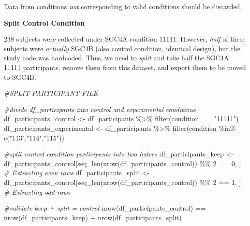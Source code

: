\documentclass[
]{article}
\newenvironment{Shaded}{\begin{snugshade}}{\end{snugshade}}
\newcommand{\CommentTok}[1]{\textcolor[rgb]{0.56,0.35,0.01}{\textit{#1}}}
\newcommand{\DecValTok}[1]{\textcolor[rgb]{0.00,0.00,0.81}{#1}}
\newcommand{\FunctionTok}[1]{\textcolor[rgb]{0.00,0.00,0.00}{#1}}
\newcommand{\NormalTok}[1]{#1}
\newcommand{\OtherTok}[1]{\textcolor[rgb]{0.56,0.35,0.01}{#1}}
\newcommand{\SpecialCharTok}[1]{\textcolor[rgb]{0.00,0.00,0.00}{#1}}
\newcommand{\StringTok}[1]{\textcolor[rgb]{0.31,0.60,0.02}{#1}}
\begin{document}
Data from conditions \emph{not} corresponding to valid conditions should
be discarded.

\textbf{Split Control Condition}

238 subjects were collected under SGC4A condition 11111. However,
\emph{half} of these subjects were \emph{actually} SGC4B (also control
condition, identical design), but the study code was hardcoded. Thus, we
need to \emph{split} and take half the SGC4A 11111 participants, remove
them from this dataset, and export them to be moved to SGC4B.

\begin{Shaded}
\begin{Highlighting}[]
\CommentTok{\#SPLIT PARTICIPANT FILE}

\CommentTok{\#divide df\_participants into control and experimental conditions}
\NormalTok{df\_participants\_control }\OtherTok{\textless{}{-}}\NormalTok{ df\_participants }\SpecialCharTok{\%\textgreater{}\%} \FunctionTok{filter}\NormalTok{(condition }\SpecialCharTok{==} \StringTok{"11111"}\NormalTok{)}
\NormalTok{df\_participants\_experimental }\OtherTok{\textless{}{-}}\NormalTok{ df\_participants }\SpecialCharTok{\%\textgreater{}\%} \FunctionTok{filter}\NormalTok{(condition }\SpecialCharTok{\%in\%}  \FunctionTok{c}\NormalTok{(}\StringTok{"113"}\NormalTok{,}\StringTok{"114"}\NormalTok{,}\StringTok{"115"}\NormalTok{))}

\CommentTok{\#split control condition participants into two halves}
\NormalTok{df\_participants\_keep }\OtherTok{\textless{}{-}}\NormalTok{ df\_participants\_control[}\FunctionTok{seq\_len}\NormalTok{(}\FunctionTok{nrow}\NormalTok{(df\_participants\_control)) }\SpecialCharTok{\%\%} \DecValTok{2} \SpecialCharTok{==} \DecValTok{0}\NormalTok{, ]   }\CommentTok{\# Extracting even rows}
\NormalTok{df\_participants\_split }\OtherTok{\textless{}{-}}\NormalTok{ df\_participants\_control[}\FunctionTok{seq\_len}\NormalTok{(}\FunctionTok{nrow}\NormalTok{(df\_participants\_control)) }\SpecialCharTok{\%\%} \DecValTok{2} \SpecialCharTok{==} \DecValTok{1}\NormalTok{, ]   }\CommentTok{\# Extracting odd rows}

\CommentTok{\#validate keep + split = control }
\FunctionTok{nrow}\NormalTok{(df\_participants\_control) }\SpecialCharTok{==} \FunctionTok{nrow}\NormalTok{(df\_participants\_keep) }\SpecialCharTok{+} \FunctionTok{nrow}\NormalTok{(df\_participants\_split)}
\end{Highlighting}
\end{Shaded}
\end{document}
